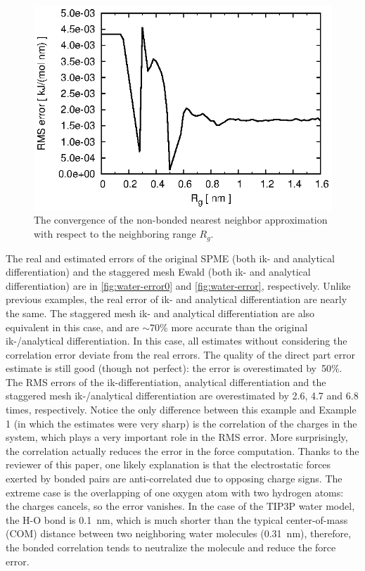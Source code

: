 \documentclass[journal=jacsat,manuscript=article]{achemso}
\newcommand{\recheck}[1]{{\color{black} #1}}
\begin{document}
\begin{figure}
  \centering
  \includegraphics[]{fig.gr.eps}
  \caption{The convergence of the non-bonded nearest neighbor approximation with respect to the neighboring range $R_g$.}
  \label{fig:gr-conv}
\end{figure}



The real and estimated errors of the original SPME
(both ik- and analytical differentiation)
and the staggered mesh Ewald (both ik- and analytical differentiation)
are in \ref{fig:water-error0}
and \ref{fig:water-error}, respectively.
Unlike previous examples, the real error of ik- and analytical differentiation
are nearly the same.
The staggered mesh ik- and analytical differentiation
are also equivalent in this case, and are $\sim$70\% more accurate
than the original ik-/analytical differentiation.
In this case,
all estimates without considering the correlation error
deviate from the real errors.
The quality of the direct
part error estimate is still good (though not perfect):
the error is overestimated by~50\%.
The RMS errors of the ik-differentiation, analytical differentiation
and the staggered mesh ik-/analytical differentiation are
overestimated by 2.6, 4.7 and 6.8 times, respectively.
Notice the only difference between this example
and Example 1 (in which the estimates were very sharp) is the correlation
of the charges in the system,
which plays a very important role in the RMS error. 
More surprisingly, the correlation
actually  reduces the error in the force computation.
\recheck{ Thanks to the reviewer of this paper, one likely
  explanation is that the electrostatic forces
  exerted by bonded pairs
  are anti-correlated due to opposing charge signs.
  The extreme case is the overlapping of one oxygen atom with two
  hydrogen atoms: the charges cancels, so the error vanishes.
  In the case of the TIP3P water model, the H-O bond is 0.1~\textsf{nm},
  which is much shorter than the typical
  center-of-mass (COM) distance between two neighboring water
  molecules (0.31~\textsf{nm}),
  therefore, the bonded correlation tends to neutralize the molecule
  and reduce the force error.}
\end{document}
